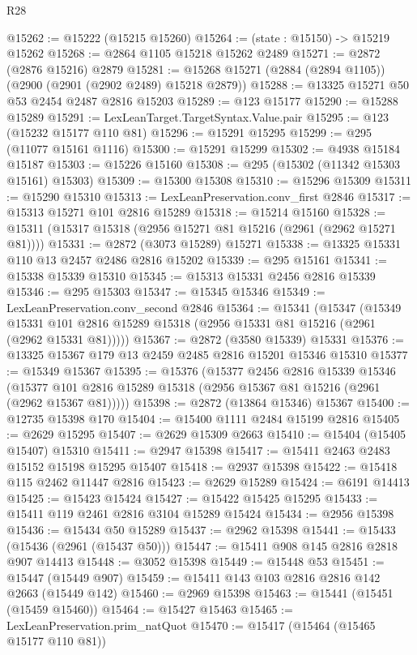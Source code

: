 \begin{lexlean}{R28}
\begin{coremodule}
@15262 := @15222 (@15215 @15260)
@15264 := (state : @15150) -> @15219 @15262
@15268 := @2864 @1105 @15218 @15262 @2489
@15271 := @2872 (@2876 @15216) @2879
@15281 := @15268 @15271 (@2884 (@2894 @1105)) (@2900 (@2901 (@2902 @2489) @15218 @2879))
@15288 := @13325 @15271 @50 @53 @2454 @2487 @2816 @15203
@15289 := @123 @15177
@15290 := @15288 @15289
@15291 := LexLeanTarget.TargetSyntax.Value.pair
@15295 := @123 (@15232 @15177 @110 @81)
@15296 := @15291 @15295
@15299 := @295 (@11077 @15161 @1116)
@15300 := @15291 @15299
@15302 := @4938 @15184 @15187
@15303 := @15226 @15160
@15308 := @295 (@15302 (@11342 @15303 @15161) @15303)
@15309 := @15300 @15308
@15310 := @15296 @15309
@15311 := @15290 @15310
@15313 := LexLeanPreservation.conv_first @2846
@15317 := @15313 @15271 @101 @2816 @15289
@15318 := @15214 @15160
@15328 := @15311 (@15317 @15318 (@2956 @15271 @81 @15216 (@2961 (@2962 @15271 @81))))
@15331 := @2872 (@3073 @15289) @15271
@15338 := @13325 @15331 @110 @13 @2457 @2486 @2816 @15202
@15339 := @295 @15161
@15341 := @15338 @15339 @15310
@15345 := @15313 @15331 @2456 @2816 @15339
@15346 := @295 @15303
@15347 := @15345 @15346
@15349 := LexLeanPreservation.conv_second @2846
@15364 := @15341
    (@15347
      (@15349 @15331 @101 @2816 @15289 @15318 (@2956 @15331 @81 @15216 (@2961 (@2962 @15331 @81)))))
@15367 := @2872 (@3580 @15339) @15331
@15376 := @13325 @15367 @179 @13 @2459 @2485 @2816 @15201 @15346 @15310
@15377 := @15349 @15367
@15395 := @15376
    (@15377
      @2456
      @2816
      @15339
      @15346
      (@15377 @101 @2816 @15289 @15318 (@2956 @15367 @81 @15216 (@2961 (@2962 @15367 @81)))))
@15398 := @2872 (@13864 @15346) @15367
@15400 := @12735 @15398 @170
@15404 := @15400 @1111 @2484 @15199 @2816
@15405 := @2629 @15295
@15407 := @2629 @15309 @2663
@15410 := @15404 (@15405 @15407) @15310
@15411 := @2947 @15398
@15417 := @15411 @2463 @2483 @15152 @15198 @15295 @15407
@15418 := @2937 @15398
@15422 := @15418 @115 @2462 @11447 @2816
@15423 := @2629 @15289
@15424 := @6191 @14413
@15425 := @15423 @15424
@15427 := @15422 @15425 @15295
@15433 := @15411 @119 @2461 @2816 @3104 @15289 @15424
@15434 := @2956 @15398
@15436 := @15434 @50 @15289
@15437 := @2962 @15398
@15441 := @15433 (@15436 (@2961 (@15437 @50)))
@15447 := @15411 @908 @145 @2816 @2818 @907 @14413
@15448 := @3052 @15398
@15449 := @15448 @53
@15451 := @15447 (@15449 @907)
@15459 := @15411 @143 @103 @2816 @2816 @142 @2663 (@15449 @142)
@15460 := @2969 @15398
@15463 := @15441 (@15451 (@15459 @15460))
@15464 := @15427 @15463
@15465 := LexLeanPreservation.prim_natQuot
@15470 := @15417 (@15464 (@15465 @15177 @110 @81))

\end{coremodule}
\end{lexlean}

